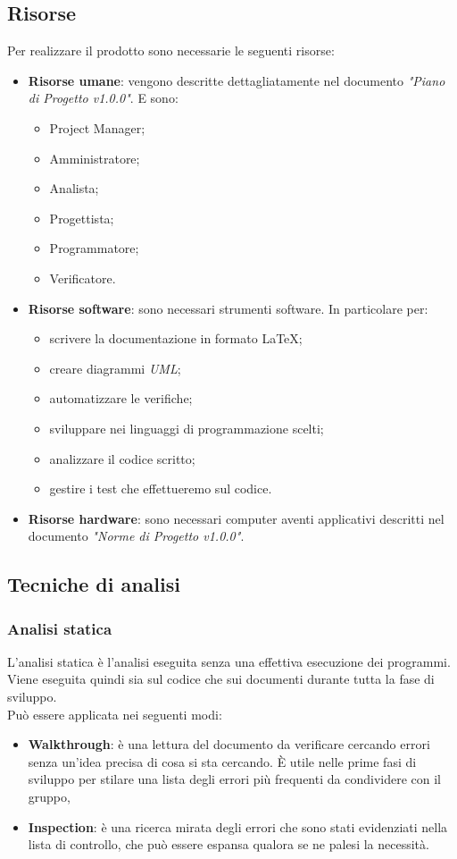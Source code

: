 \documentclass[12pt,a4paper,titlepage]{article}
\begin{document}
	\subsection{Risorse}
	Per realizzare il prodotto sono necessarie le seguenti risorse:
	\begin{itemize}
		\item \textbf{Risorse umane}: vengono descritte dettagliatamente nel documento \textit{"Piano di Progetto v1.0.0"}. E sono:
		\begin{itemize}
			\item Project Manager;
			\item Amministratore;
			\item Analista;
			\item Progettista;
			\item Programmatore;
			\item Verificatore.
		\end{itemize}
		\item \textbf{Risorse software}: sono necessari strumenti software. In particolare per:
		\begin{itemize}
			\item scrivere la documentazione in formato \LaTeX;
			\item creare diagrammi \textit{UML};
			\item automatizzare le verifiche;
			\item sviluppare nei linguaggi di programmazione scelti;
			\item analizzare il codice scritto;
			\item gestire i test che effettueremo sul codice.
		\end{itemize}
		\item \textbf{Risorse hardware}: sono necessari computer aventi applicativi descritti nel documento \textit{"Norme di Progetto v1.0.0"}. 
	\end{itemize}

	\subsection{Tecniche di analisi}
		\subsubsection{Analisi statica}
		L'analisi statica è l'analisi eseguita senza una effettiva esecuzione dei programmi. Viene eseguita quindi sia sul codice che sui documenti durante tutta la fase di sviluppo.\\
		Può essere applicata nei seguenti modi:
		\begin{itemize}
			\item \textbf{Walkthrough}: è una lettura del documento da verificare cercando errori senza un'idea precisa di cosa si sta cercando. È utile nelle prime fasi di sviluppo per stilare una lista degli errori più frequenti da condividere con il gruppo,
			\item \textbf{Inspection}: è una ricerca mirata degli errori che sono stati evidenziati nella lista di controllo, che può essere espansa qualora se ne palesi la necessità.
		\end{itemize}
	
\end{document}
